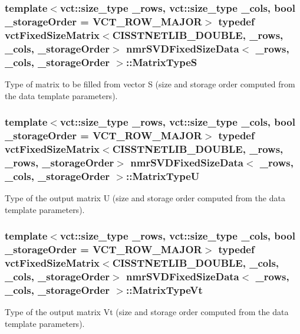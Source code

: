 \subsubsection[{Matrix\+Type\+S}]{\setlength{\rightskip}{0pt plus 5cm}template$<$vct\+::size\+\_\+type \+\_\+rows, vct\+::size\+\_\+type \+\_\+cols, bool \+\_\+storage\+Order = V\+C\+T\+\_\+\+R\+O\+W\+\_\+\+M\+A\+J\+O\+R$>$ typedef {\bf vct\+Fixed\+Size\+Matrix}$<$C\+I\+S\+S\+T\+N\+E\+T\+L\+I\+B\+\_\+\+D\+O\+U\+B\+L\+E, \+\_\+rows, \+\_\+cols, \+\_\+storage\+Order$>$ {\bf nmr\+S\+V\+D\+Fixed\+Size\+Data}$<$ \+\_\+rows, \+\_\+cols, \+\_\+storage\+Order $>$\+::{\bf Matrix\+Type\+S}}\label{classnmr_s_v_d_fixed_size_data_a4abee9caa16efd9bed6df1b4deec9207}
Type of matrix to be filled from vector S (size and storage order computed from the data template parameters). \hypertarget{classnmr_s_v_d_fixed_size_data_a164bbc8eccf8b1102d5a85dde45de99d}{}
\subsubsection[{Matrix\+Type\+U}]{\setlength{\rightskip}{0pt plus 5cm}template$<$vct\+::size\+\_\+type \+\_\+rows, vct\+::size\+\_\+type \+\_\+cols, bool \+\_\+storage\+Order = V\+C\+T\+\_\+\+R\+O\+W\+\_\+\+M\+A\+J\+O\+R$>$ typedef {\bf vct\+Fixed\+Size\+Matrix}$<$C\+I\+S\+S\+T\+N\+E\+T\+L\+I\+B\+\_\+\+D\+O\+U\+B\+L\+E, \+\_\+rows, \+\_\+rows, \+\_\+storage\+Order$>$ {\bf nmr\+S\+V\+D\+Fixed\+Size\+Data}$<$ \+\_\+rows, \+\_\+cols, \+\_\+storage\+Order $>$\+::{\bf Matrix\+Type\+U}}\label{classnmr_s_v_d_fixed_size_data_a164bbc8eccf8b1102d5a85dde45de99d}
Type of the output matrix U (size and storage order computed from the data template parameters). \hypertarget{classnmr_s_v_d_fixed_size_data_ab9a7c396f7a83256d5e8c789b3a23591}{}
\subsubsection[{Matrix\+Type\+Vt}]{\setlength{\rightskip}{0pt plus 5cm}template$<$vct\+::size\+\_\+type \+\_\+rows, vct\+::size\+\_\+type \+\_\+cols, bool \+\_\+storage\+Order = V\+C\+T\+\_\+\+R\+O\+W\+\_\+\+M\+A\+J\+O\+R$>$ typedef {\bf vct\+Fixed\+Size\+Matrix}$<$C\+I\+S\+S\+T\+N\+E\+T\+L\+I\+B\+\_\+\+D\+O\+U\+B\+L\+E, \+\_\+cols, \+\_\+cols, \+\_\+storage\+Order$>$ {\bf nmr\+S\+V\+D\+Fixed\+Size\+Data}$<$ \+\_\+rows, \+\_\+cols, \+\_\+storage\+Order $>$\+::{\bf Matrix\+Type\+Vt}}\label{classnmr_s_v_d_fixed_size_data_ab9a7c396f7a83256d5e8c789b3a23591}
Type of the output matrix Vt (size and storage order computed from the data template parameters). \hypertarget{classnmr_s_v_d_fixed_size_data_a2622c8b24534929513816ff92ac83216}{}
